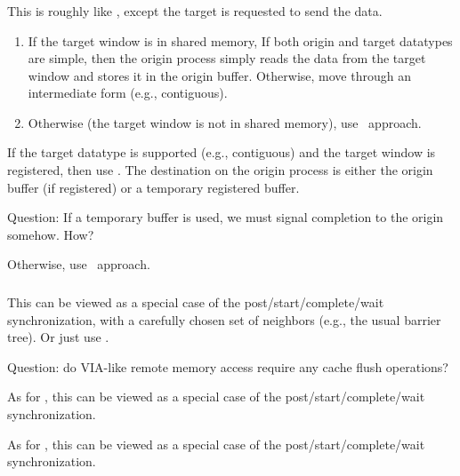 \documentclass{article}
\begin{document}
\subsubsection{}
\begin{tcp}
This is roughly like , except the target is requested to send
the data.  
\end{tcp}
\begin{shmem}
\begin{enumerate}
\item If the target window is in shared memory, 
If both origin and target datatypes are simple, then the origin process simply
reads the data from the target window and stores it in the origin buffer.
Otherwise, move through an intermediate form (e.g., contiguous).  

\item Otherwise (the target window is not in shared memory), 
use \tcpname\ approach.
\end{enumerate}
\end{shmem}
\begin{via}
If the target datatype is supported (e.g., contiguous) and the target window
is registered, then use .  The destination on the origin
process is either the origin buffer (if registered) or a temporary registered
buffer.  

Question: If a temporary buffer is used, we must signal completion to the
origin somehow.  How?

Otherwise, use \tcpname\ approach.
\end{via}

\subsubsection{}
\begin{tcp}
This can be viewed as a special case of the post/start/complete/wait
synchronization, with a carefully chosen set of neighbors (e.g., the usual
barrier tree).  Or just use .  

Question: do VIA-like remote memory access require any cache flush operations?
\end{tcp}

\begin{shmem}
As for \tcpname, this can be viewed as a special case of the
post/start/complete/wait synchronization. 
\end{shmem}

\begin{via}
As for \tcpname, this can be viewed as a special case of the
post/start/complete/wait synchronization. 
\end{via}
\end{document}
